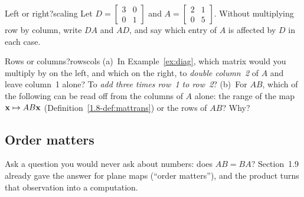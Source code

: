 \documentclass[11pt]{article}
\begin{document}
\begin{kc}{Left or right?}{scaling}
Let $D=\begin{bmatrix}3&0\\0&1\end{bmatrix}$ and $A=\begin{bmatrix}2&1\\0&5\end{bmatrix}$. Without multiplying row by column, write $DA$ and $AD$, and say which entry of $A$ is affected by $D$ in each case.
\end{kc}

\begin{think}{Rows or columns?}{rowscols}
(a)~In Example~\ref{ex:diag}, which matrix would you multiply by on the left, and which on the right, to \emph{double column~2} of $A$ and leave column~1 alone? To \emph{add three times row~1 to row~2}? (b)~For $AB$, which of the following can be read off from the columns of $A$ alone: the range of the map $\mathbf{x}\mapsto AB\mathbf{x}$ (Definition~\ref{1.8-def:mattrans}) or the rows of $AB$? Why?
\end{think}

\subsection*{Order matters}

Ask a question you would never ask about numbers: does $AB=BA$? Section~1.9 already gave the answer for plane maps (``order matters''), and the product turns that observation into a computation.
\end{document}
